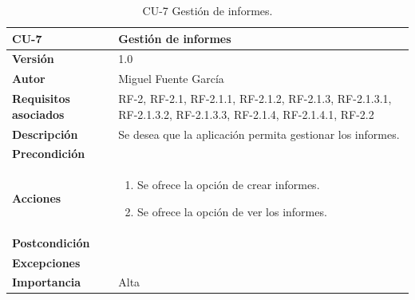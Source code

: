 \begin{table}[p]
	\centering
	\begin{tabularx}{\linewidth}{ p{} p{} }
		\toprule
		\textbf{CU-7}    & \textbf{Gestión de informes}\\
		\toprule
		\textbf{Versión}              & 1.0    \\
		\textbf{Autor}                & Miguel Fuente García \\
		\textbf{Requisitos asociados} & RF-2, RF-2.1, RF-2.1.1, RF-2.1.2, RF-2.1.3, RF-2.1.3.1, RF-2.1.3.2, RF-2.1.3.3, RF-2.1.4, RF-2.1.4.1, RF-2.2  \\
		\textbf{Descripción}          & Se desea que la aplicación permita gestionar los informes. \\
		\textbf{Precondición}         &  \\
		\textbf{Acciones}             &
		\begin{enumerate}
			\def\labelenumi{\arabic{enumi}.}
			\tightlist
			\item Se ofrece la opción de crear informes.
            \item Se ofrece la opción de ver los informes.
            
		\end{enumerate}\\
		\textbf{Postcondición}        &  \\
		\textbf{Excepciones}          &  \\
		\textbf{Importancia}          & Alta  \\
		\bottomrule
	\end{tabularx}
	\caption{CU-7 Gestión de informes.}
\end{table}


